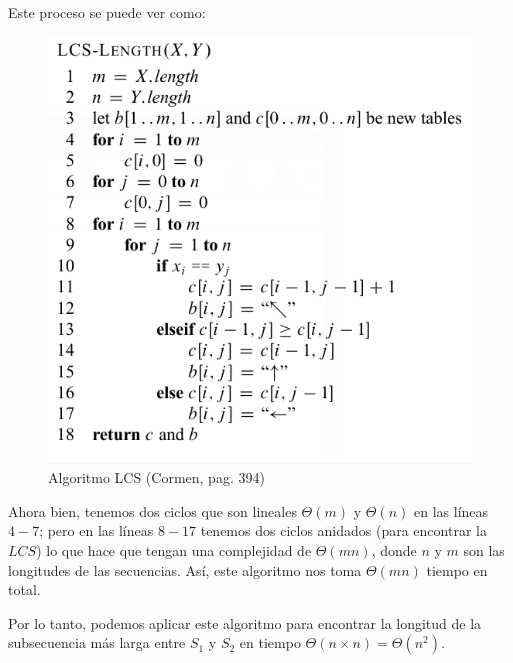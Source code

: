 \documentclass[letterpaper,11pt]{article}
\begin{document}
\begin{enumerate}
    Este proceso se puede ver como:
    \begin{figure}[h]
        \centering
        \includegraphics[width=0.5\linewidth]{imagenes/LCS.png}
        \caption{Algoritmo LCS (Cormen, pag. 394)}
        \label{fig:lcs}
    \end{figure}

    Ahora bien, tenemos dos ciclos que son lineales $\Theta(m)$ y $\Theta(n)$ en 
    las líneas $4 - 7$; pero en las líneas $8 - 17$ tenemos dos ciclos anidados 
    (para encontrar la $LCS$) lo que hace que tengan una complejidad de 
    $\Theta(mn)$, donde $n$ y $m$ son las longitudes de las secuencias. Así, 
    este algoritmo nos toma $\Theta(mn)$ tiempo en total.

    Por lo tanto, podemos aplicar este algoritmo para encontrar la longitud de 
    la subsecuencia más larga entre $S_1$ y $S_2$ en tiempo
    $\Theta(n \times n) = \Theta(n^2)$.

\end{enumerate}
\end{document}
